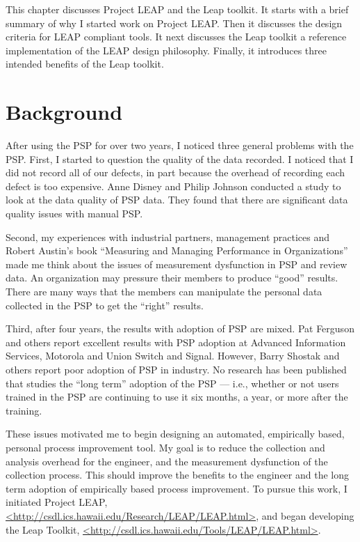 This chapter discusses Project LEAP and the Leap toolkit.  It starts with a
brief summary of why I started work on Project LEAP.  Then it discusses the
design criteria for LEAP compliant tools.  It next discusses the Leap toolkit a 
reference implementation of the LEAP design philosophy.  Finally, it introduces 
three intended benefits of the Leap toolkit.


\section{Background}

After using the PSP for over two years, I noticed three general problems with
the PSP.  First, I started to question the quality of the data recorded.  I
noticed that I did not record all of our defects, in part because the overhead
of recording each defect is too expensive.  Anne Disney and Philip Johnson
conducted a study to look at the data quality of PSP data.  They found that
there are significant data quality issues with manual PSP.\cite{Disney98,
  Disney98a}

Second, my experiences with industrial partners, management practices and
Robert Austin's book ``Measuring and Managing Performance in
Organizations''\cite{Austin96} made me think about the issues of measurement
dysfunction in PSP and review data.  An organization may pressure their members
to produce ``good'' results.  There are many ways that the members can
manipulate the personal data collected in the PSP to get the ``right'' results.

Third, after four years, the results with adoption of PSP are mixed.  Pat
Ferguson and others report excellent results with PSP adoption at Advanced
Information Services, Motorola and Union Switch and Signal\cite{Ferguson97}.
However, Barry Shostak and others report poor adoption of PSP in
industry\cite{Shostak96,Emam96}. No research has been published that studies
the ``long term'' adoption of the PSP --- i.e., whether or not users trained in
the PSP are continuing to use it six months, a year, or more after the
training.

These issues motivated me to begin designing an automated, empirically based,
personal process improvement tool.  My goal is to reduce the collection and
analysis overhead for the engineer, and the measurement dysfunction of the
collection process.  This should improve the benefits to the engineer and the
long term adoption of empirically based process improvement.  To pursue this
work, I initiated Project LEAP,
\url{<http://csdl.ics.hawaii.edu/Research/LEAP/LEAP.html>}, and began
developing the Leap Toolkit,
\url{<http://csdl.ics.hawaii.edu/Tools/LEAP/LEAP.html>}.

